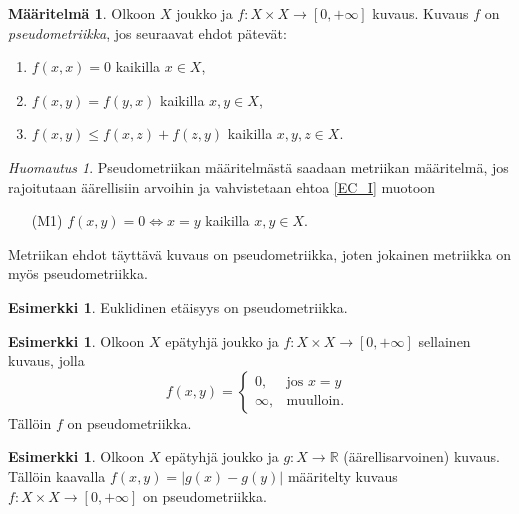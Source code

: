 \documentclass[12pt,a4paper,leqno]{report}
\newcommand{\R}{\mathbb{R}}
\theoremstyle{plain}
\theoremstyle{definition}
\newtheorem{maar}[equation]{Määritelmä}
\newtheorem{esim}[equation]{Esimerkki}
\theoremstyle{remark}
\newtheorem{huom}[equation]{Huomautus}
\begin{document}
\begin{maar}\label{pseudo_maar}
Olkoon $X$ joukko ja $f\colon X\times X\rightarrow [0,+\infty]$ 
kuvaus. Kuvaus $f$ on \emph{pseudometriikka}, jos seuraavat ehdot pätevät:
\begin{enumerate} [label=(P\arabic*),ref=(P\arabic*)]
\item\label{EC_I} $f(x,x)=0$ kaikilla $x\in X$,
\item\label{EC_II} $f(x,y)=f(y,x)$ kaikilla $x,y\in X$,
\item\label{EC_III} $f(x,y)\leq f(x,z)+f(z,y)$ kaikilla $x,y,z\in X$.
\end{enumerate}
\end{maar}
\begin{huom}
Pseudometriikan määritelmästä saadaan metriikan määritelmä, jos rajoitutaan äärellisiin arvoihin ja vahvistetaan ehtoa \ref{EC_I} muotoon 
\begin{enumerate} %
\item[(M1)]\label{M1} $f(x,y)=0\Leftrightarrow x=y$ kaikilla $x,y\in X.$
\end{enumerate}
Metriikan ehdot täyttävä kuvaus on pseudometriikka, 
joten %
jokainen metriikka on myös pseudometriikka.
\end{huom}
\begin{esim}%
Euklidinen etäisyys on pseudometriikka.
\end{esim}
\begin{esim}%
Olkoon $X$ epätyhjä joukko ja $f\colon X\times X\rightarrow [0,+\infty]$ sellainen kuvaus, jolla
\begin{equation*}
f(x,y) = \begin{cases} 0, & \mbox{jos } x=y\\
\infty, & \mbox{muulloin. } \end{cases}
\end{equation*}
Tällöin $f$ on pseudometriikka.
\end{esim}
\begin{esim}%
Olkoon $X$ epätyhjä joukko ja $g\colon X\rightarrow \R$ (äärellisarvoinen) kuvaus. Tällöin kaavalla $f(x,y)=|g(x)-g(y)|$ määritelty kuvaus $f\colon X\times X\rightarrow[0,+\infty]$ on pseudometriikka.
\end{esim}
\end{document}
